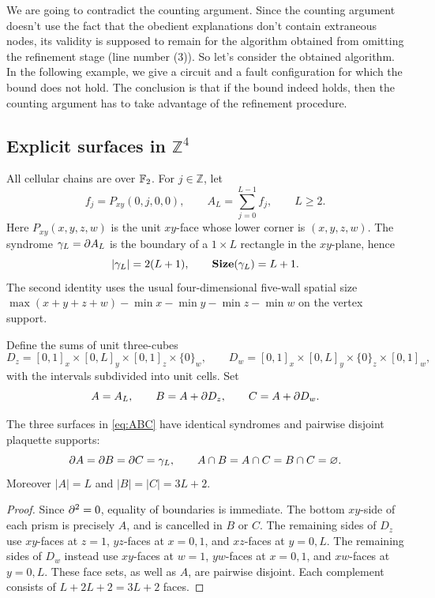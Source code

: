 \documentclass[manuscript,screen,review]{acmart}
\begin{document}
We are going to contradict the counting argument. Since the counting argument doesn't use the fact that the obedient explanations don't contain extraneous nodes, its validity is supposed to remain for the algorithm obtained from omitting the refinement stage (line number (3)). So let's consider the obtained algorithm. In the following example, we give a circuit and a fault configuration for which the bound does not hold. The conclusion is that if the bound indeed holds, then the counting argument has to take advantage of the refinement procedure.

\subsection{Explicit surfaces in $\mathbb Z^4$}
All cellular chains are over $\mathbb F_2$. For $j\in\mathbb Z$, let
\[
 f_j=P_{xy}(0,j,0,0),\qquad
 A_L=\sum_{j=0}^{L-1}f_j,\qquad L\ge 2.
\]
Here $P_{xy}(x,y,z,w)$ is the unit $xy$-face whose lower corner is $(x,y,z,w)$. The syndrome $\gamma_L=\partial A_L$ is the boundary of a $1\times L$ rectangle in the $xy$-plane, hence
\begin{equation}\label{eq:loop}
  |\gamma_L|=2(L+1),\qquad \mathbf{Size}(\gamma_L)=L+1.
\end{equation}
The second identity uses the usual four-dimensional five-wall spatial size $\max(x+y+z+w)-\min x-\min y-\min z-\min w$ on the vertex support.

Define the sums of unit three-cubes
\[
 D_z=[0,1]_x\times[0,L]_y\times[0,1]_z\times\{0\}_w,
 \qquad
 D_w=[0,1]_x\times[0,L]_y\times\{0\}_z\times[0,1]_w,
\]
with the intervals subdivided into unit cells. Set
\begin{equation}\label{eq:ABC}
 A=A_L,\qquad B=A+\partial D_z,\qquad C=A+\partial D_w.
\end{equation}

\begin{lemma}\label{lem:three}
The three surfaces in \eqref{eq:ABC} have identical syndromes and pairwise disjoint plaquette supports:
\[
 \partial A=\partial B=\partial C=\gamma_L,
 \qquad A\cap B=A\cap C=B\cap C=\varnothing.
\]
Moreover $|A|=L$ and $|B|=|C|=3L+2$.
\end{lemma}
\begin{proof}
Since $\partial^2=0$, equality of boundaries is immediate. The bottom $xy$-side of each prism is precisely $A$, and is cancelled in $B$ or $C$. The remaining sides of $D_z$ use $xy$-faces at $z=1$, $yz$-faces at $x=0,1$, and $xz$-faces at $y=0,L$. The remaining sides of $D_w$ instead use $xy$-faces at $w=1$, $yw$-faces at $x=0,1$, and $xw$-faces at $y=0,L$. These face sets, as well as $A$, are pairwise disjoint. Each complement consists of $L+2L+2=3L+2$ faces.
\end{proof}
\end{document}
